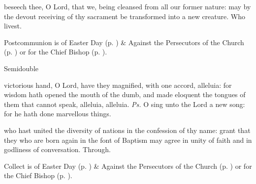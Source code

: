 \postcommunion
{} beseech thee, O Lord, that we, being cleansed from all our former nature: may by the devout receiving of thy sacrament be transformed into a new creature. Who livest.
\begin{rubric}
     Postcommunion is of Easter Day (p. \pageref{EasterPostcommunion}) \&  Against the Persecutors of the Church (p. \pageref{SPAgainst}) or for the Chief Bishop (p. \pageref{SPChiefBishop}).
\end{rubric}


\begin{inhead}
    {Semidouble}
\end{inhead}

\properantiphonfix

\introit
{} victorious hand, O Lord, have they magnified, with one accord, alleluia: for wisdom hath opened the mouth of the dumb, and made eloquent the tongues of them that cannot speak, alleluia, alleluia. \textit{Ps.} O sing unto the Lord a new song: for he hath done marvellous things.

\collect
{} who hast united the diversity of nations in the confession of thy name: grant that they who are born again in the font of Baptism may agree in unity of faith and in godliness of conversation. Through.
\begin{rubric}
     Collect is of Easter Day (p. \pageref{EasterCollect}) \&  Against the Persecutors of the Church (p. \pageref{SPAgainst}) or for the Chief Bishop (p. \pageref{SPChiefBishop}).
\end{rubric}

